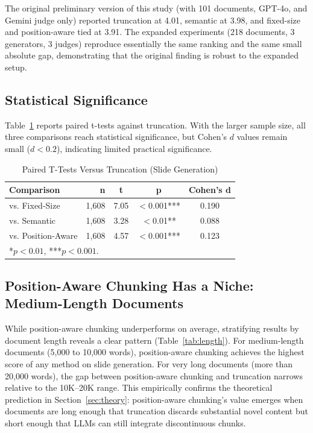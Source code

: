 \documentclass{ieeeaccess}
\begin{document}
The original preliminary version of this study (with 101 documents, GPT-4o, and Gemini judge only) reported truncation at 4.01, semantic at 3.98, and fixed-size and position-aware tied at 3.91. The expanded experiments (218 documents, 3 generators, 3 judges) reproduce essentially the same ranking and the same small absolute gap, demonstrating that the original finding is robust to the expanded setup.

\subsection{Statistical Significance}

Table~\ref{tab:significance} reports paired t-tests against truncation. With the larger sample size, all three comparisons reach statistical significance, but Cohen's $d$ values remain small ($d < 0.2$), indicating limited practical significance.

\begin{table}[h]
\caption{Paired T-Tests Versus Truncation (Slide Generation)}
\label{tab:significance}
\centering
\footnotesize
\begin{tabular}{|l|r|c|c|c|}
\hline
\textbf{Comparison} & \textbf{n} & \textbf{t} & \textbf{p} & \textbf{Cohen's d} \\
\hline
vs. Fixed-Size & 1,608 & 7.05 & $<$0.001*** & 0.190 \\
vs. Semantic & 1,608 & 3.28 & $<$0.01** & 0.088 \\
vs. Position-Aware & 1,608 & 4.57 & $<$0.001*** & 0.123 \\
\hline
\multicolumn{5}{l}{\scriptsize **$p < 0.01$, ***$p < 0.001$.}
\end{tabular}
\end{table}

\subsection{Position-Aware Chunking Has a Niche: Medium-Length Documents}

While position-aware chunking underperforms on average, stratifying results by document length reveals a clear pattern (Table~\ref{tab:length}). For medium-length documents (5,000 to 10,000 words), position-aware chunking achieves the highest score of any method on slide generation. For very long documents (more than 20,000 words), the gap between position-aware chunking and truncation narrows relative to the 10K--20K range. This empirically confirms the theoretical prediction in Section~\ref{sec:theory}: position-aware chunking's value emerges when documents are long enough that truncation discards substantial novel content but short enough that LLMs can still integrate discontinuous chunks.
\end{document}

